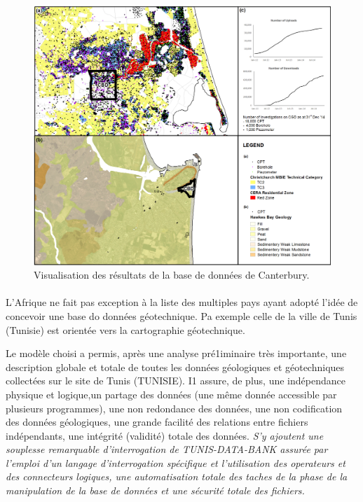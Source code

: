 \begin{figure}[t]
\centering
\includegraphics[width=1\textwidth]{cgd.png}
\caption{Visualisation des résultats de la base de données de Canterbury.}
\end{figure}


\paragraph{}
L'Afrique ne fait pas exception à la liste des multiples pays ayant adopté l'idée
de concevoir une base do données géotechnique.
Pa exemple celle de la ville de Tunis (Tunisie) est orientée vers la cartographie géotechnique.
\par
Le modèle choisi a permis, après une analyse
pré1iminaire très importante, une description globale et
totale de toutes les données géologiques et géotechniques collectées sur le site de Tunis (TUNISIE). I1
assure, de plus, une indépendance physique et logique,un partage des données (une même donnée accessible  
par plusieurs programmes), une non redondance des données, une non codification des
données géologiques, une grande facilité des relations
entre fichiers indépendants, une intégrité (validité)
totale des données. 
\textit{S'y ajoutent une souplesse remarquable d'interrogation de TUNIS-DATA-BANK
assurée par l'emploi d'un langage d'interrogation spécifique et l'utilisation des operateurs et des connecteurs
logiques, une automatisation totale des taches de la
phase de la manipulation de la base de données et une
sécurité totale des fichiers.}
\cite{tunis}

